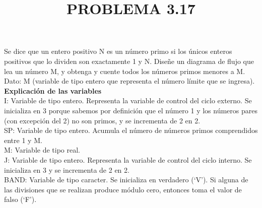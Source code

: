 \documentclass[11pt]{amsart}
\title{PROBLEMA 3.17}
\begin{document}
\maketitle
\noindent Se dice que un entero positivo N es un número primo si los únicos enteros positivos que lo dividen son exactamente 1 y N. Diseñe un diagrama de flujo que lea un número M, y obtenga y cuente todos los números primos menores a M.\\

\noindent  Dato: M (variable de tipo entero que representa el número límite que se ingresa).\\

\noindent \textbf {Explicación de las variables} \\

\noindent \quad I: Variable de tipo entero. Representa la variable de control del ciclo externo. Se inicializa en 3 porque sabemos por definición que el número 1 y los números pares (con excepción del 2) no son primos, y se incrementa de 2 en 2. \\

\noindent \quad SP: Variable de tipo entero. Acumula el número de números primos comprendidos entre 1 y M.\\

\noindent \quad M: Variable de tipo real.\\

\noindent \quad  J: Variable de tipo entero. Representa la variable de control del ciclo interno. Se inicializa en 3 y se incrementa de 2 en 2.\\

\noindent \quad BAND: Variable de tipo caracter. Se inicializa en verdadero (‘V’). Si alguna de las divisiones que se realizan produce módulo cero, entonces toma el valor de falso (‘F’).\\
\end{document}
